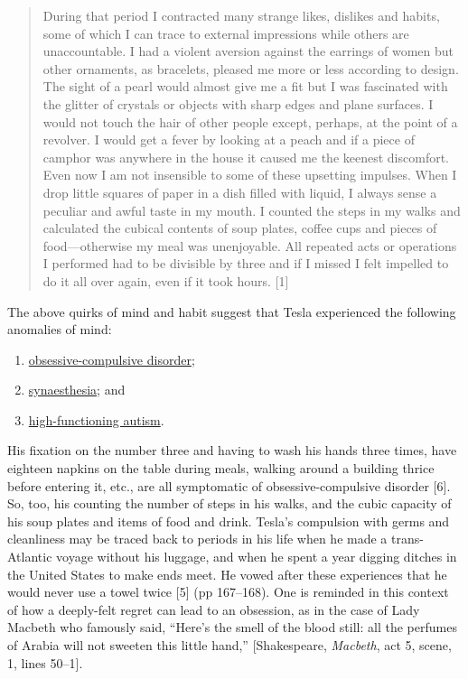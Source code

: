 \documentclass[
  12pt,
  british,
  a4paper,
]{article}
\providecommand{\tightlist}{%
  \setlength{\itemsep}{0pt}\setlength{\parskip}{0pt}}
\begin{document}
\begin{quote}
During that period I contracted many strange likes, dislikes and habits,
some of which I can trace to external impressions while others are
unaccountable. I had a violent aversion against the earrings of women
but other ornaments, as bracelets, pleased me more or less according to
design. The sight of a pearl would almost give me a fit but I was
fascinated with the glitter of crystals or objects with sharp edges and
plane surfaces. I would not touch the hair of other people except,
perhaps, at the point of a revolver. I would get a fever by looking at a
peach and if a piece of camphor was anywhere in the house it caused me
the keenest discomfort. Even now I am not insensible to some of these
upsetting impulses. When I drop little squares of paper in a dish filled
with liquid, I always sense a peculiar and awful taste in my mouth. I
counted the steps in my walks and calculated the cubical contents of
soup plates, coffee cups and pieces of food---otherwise my meal was
unenjoyable. All repeated acts or operations I performed had to be
divisible by three and if I missed I felt impelled to do it all over
again, even if it took hours. {[}1{]}
\end{quote}

The above quirks of mind and habit suggest that Tesla experienced the
following anomalies of mind:

\begin{enumerate}
\tightlist
\item
  \href{https://en.wikipedia.org/wiki/Obsessive\%E2\%80\%93compulsive_disorder}{obsessive-compulsive
  disorder};
\item
  \href{https://en.wikipedia.org/wiki/Synesthesia}{synaesthesia}; and
\item
  \href{https://en.wikipedia.org/wiki/High-functioning_autism}{high-functioning
  autism}.
\end{enumerate}

His fixation on the number three and having to wash his hands three
times, have eighteen napkins on the table during meals, walking around a
building thrice before entering it, etc., are all symptomatic of
obsessive-compulsive disorder {[}6{]}. So, too, his counting the number
of steps in his walks, and the cubic capacity of his soup plates and
items of food and drink. Tesla's compulsion with germs and cleanliness
may be traced back to periods in his life when he made a trans-Atlantic
voyage without his luggage, and when he spent a year digging ditches in
the United States to make ends meet. He vowed after these experiences
that he would never use a towel twice {[}5{]} (pp 167--168). One is
reminded in this context of how a deeply-felt regret can lead to an
obsession, as in the case of Lady Macbeth who famously said, ``Here's
the smell of the blood still: all the perfumes of Arabia will not
sweeten this little hand,'' {[}Shakespeare, \emph{Macbeth}, act 5,
scene, 1, lines 50--1{]}.
\end{document}
